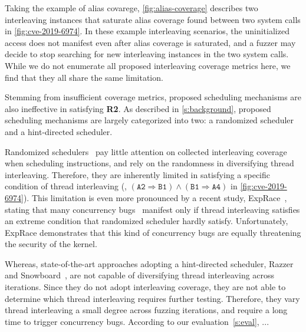 Taking the example of alias covarege, \autoref{fig:alias-coverage}
describes two interleaving instances that saturate alias coverage
found between two system calls in \autoref{fig:cve-2019-6974}.
%
In these example interleaving scenarios, the uninitialized access does
not manifest even after alias coverage is saturated, and a fuzzer may
decide to stop searching for new interleaving instances in the two
system calls.
%
While we do not enumerate all proposed interleaving coverage metrics
here, we find that they all share the same limitation.


%
Stemming from insufficient coverage metrics, proposed scheduling
mechanisms are also ineffective in satisfying \textbf{R2}.
%
As described in \autoref{s:background}, proposed scheduling mechanisms
are largely categorized into two: a randomized scheduler and a
hint-directed scheduler.

%
Randomized schedulers~\cite{krace, pctalgorithm, muzz, ski} pay little
attention on collected interleaving coverage when scheduling
instructions, and rely on the randomness in diversifying thread
interleaving.
%
Therefore, they are inherently limited in satisfying a specific
condition of thread interleaving (\eg,
$(\texttt{A2} \Rightarrow \texttt{B1}) \wedge (\texttt{B1} \Rightarrow
\texttt{A4})$ in \autoref{fig:cve-2019-6974}).
%
This limitation is even more pronounced by a recent study,
ExpRace~\cite{exprace}, stating that many concurrency
bugs~\cite{cve20196974, cve20191999, cve201911486} manifest only if
thread interleaving satisfies an extreme condition that randomized
scheduler hardly satisfy.
%
Unfortunately, ExpRace demonstrates that this kind of concurrency bugs
are equally threatening the security of the kernel.


Whereas, %
state-of-the-art approaches adopting a hint-directed
scheduler, Razzer~\cite{razzer} and Snowboard~\cite{snowboard}, are
not capable of diversifying thread interleaving across iterations.
%
Since they do not adopt interleaving coverage, they are not able to
determine which thread interleaving requires further
testing. Therefore, they vary thread interleaving a small degree
across fuzzing iterations, and require a long time to trigger
concurrency bugs.
%
According to our evaluation~\autoref{s:eval}, ...


